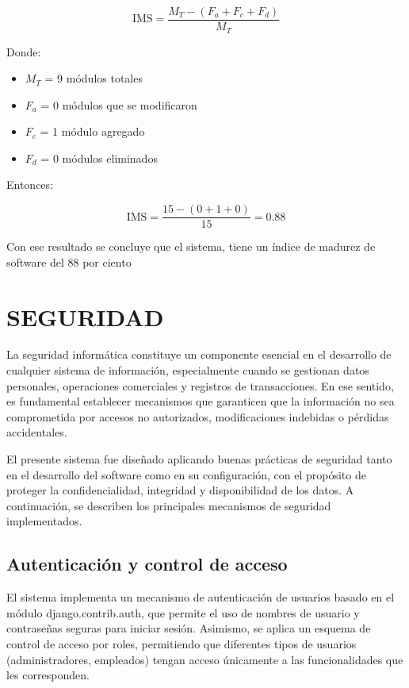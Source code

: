 	\[
		\text{IMS} = \frac{M_T - (F_a + F_c + F_d)}{M_T}
	\]
	
	Donde:
	
	\begin{flushleft}
		\begin{itemize}
			\item $M_T$ = 9 módulos totales
			\item $F_a$ = 0 módulos que se modificaron
			\item $F_c$ = 1 módulo agregado
			\item $F_d$ = 0 módulos eliminados
		\end{itemize}
	\end{flushleft}
	
	Entonces:
	
	\[
		\text{IMS} = \frac{15 - (0 + 1 + 0)}{15} = 0.88
	\]
	
	Con ese resultado se concluye que el sistema, tiene un índice de madurez de software del 88 por ciento%
	
\section{SEGURIDAD}

	La seguridad informática constituye un componente esencial en el desarrollo de cualquier sistema de información, especialmente cuando se gestionan datos personales, operaciones comerciales y registros de transacciones. En ese sentido, es fundamental establecer mecanismos que garanticen que la información no sea comprometida por accesos no autorizados, modificaciones indebidas o pérdidas accidentales.
	
	El presente sistema fue diseñado aplicando buenas prácticas de seguridad tanto en el desarrollo del software como en su configuración, con el propósito de proteger la confidencialidad, integridad y disponibilidad de los datos. A continuación, se describen los principales mecanismos de seguridad implementados.

\subsection{Autenticación y control de acceso}

	El sistema implementa un mecanismo de autenticación de usuarios basado en el módulo django.contrib.auth, que permite el uso de nombres de usuario y contraseñas seguras para iniciar sesión. Asimismo, se aplica un esquema de control de acceso por roles, permitiendo que diferentes tipos de usuarios (administradores, empleados) tengan acceso únicamente a las funcionalidades que les corresponden.
	
